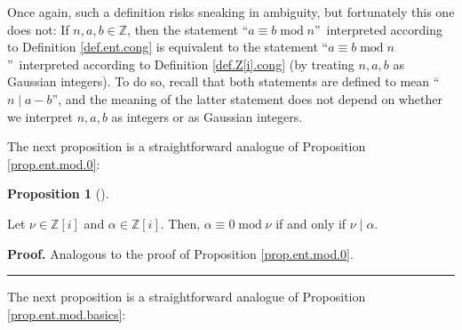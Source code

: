 \documentclass[numbers=enddot,12pt,final,onecolumn,notitlepage]{scrartcl}%
\numberwithin{exer}{subsection}
\theoremstyle{definition}
\newtheorem{prop}[theo]{Proposition}
\newenvironment{proposition}[1][]
{\begin{prop}[#1]\begin{leftbar}}
{\end{leftbar}\end{prop}}
\newenvironment{proof}[1][Proof]{\noindent\textbf{#1.} }{\ \rule{0.5em}{0.5em}}
\begin{document}
Once again, such a definition risks sneaking in ambiguity, but fortunately
this one does not: If $n,a,b\in\mathbb{Z}$, then the statement
\textquotedblleft$a\equiv b\operatorname{mod}n$\textquotedblright\ interpreted
according to Definition \ref{def.ent.cong} is equivalent to the statement
\textquotedblleft$a\equiv b\operatorname{mod}n$\textquotedblright\ interpreted
according to Definition \ref{def.Z[i].cong} (by treating $n,a,b$ as Gaussian
integers). To do so, recall that both statements are defined to mean
\textquotedblleft$n\mid a-b$\textquotedblright, and the meaning of the latter
statement does not depend on whether we interpret $n,a,b$ as integers or as
Gaussian integers.

The next proposition is a straightforward analogue of Proposition
\ref{prop.ent.mod.0}:

\begin{proposition}
\label{prop.Z[i].mod.0}Let $\nu\in\mathbb{Z}\left[  i\right]  $ and $\alpha
\in\mathbb{Z}\left[  i\right]  $. Then, $\alpha\equiv0\operatorname{mod}\nu$
if and only if $\nu\mid\alpha$.
\end{proposition}

\begin{proof}
Analogous to the proof of Proposition \ref{prop.ent.mod.0}.
\end{proof}

The next proposition is a straightforward analogue of Proposition
\ref{prop.ent.mod.basics}:
\end{document}
